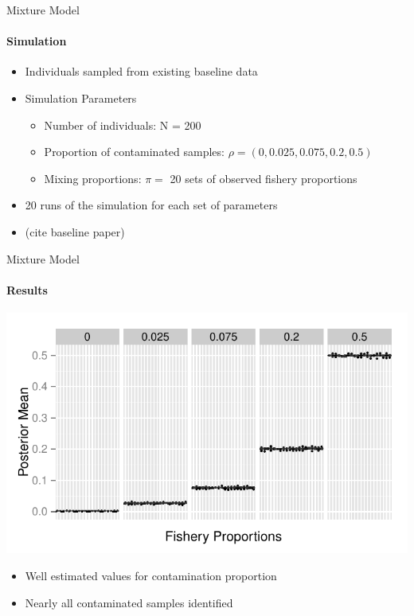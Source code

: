 \documentclass[letter,graphicx]{beamer}
\begin{document}
\begin{frame}{Mixture Model}
\framesubtitle{Simulation}
\begin{itemize}
	\item Individuals sampled from existing baseline data
	\vspace{3mm}
	\item Simulation Parameters
	\begin{itemize}
		\item Number of individuals: N = 200
		\vspace{1.5mm}
		\item Proportion of contaminated samples: $\rho = (0, 0.025, 0.075, 0.2, 0.5)$
		\vspace{1.5mm}
		\item Mixing proportions: $\pi = $ 20 sets of observed fishery proportions
	\end{itemize}
	\vspace{3mm}
	\item 20 runs of the simulation for each set of parameters
	\item (cite baseline paper)
\end{itemize}
\end{frame}

\begin{frame}{Mixture Model}
\framesubtitle{Results}

\centering
\includegraphics[width=.9\textwidth]{images/mixed_rho.pdf}

\begin{itemize}
	\item Well estimated values for contamination proportion
	\item Nearly all contaminated samples identified
\end{itemize}

\end{frame} 
\end{document}

